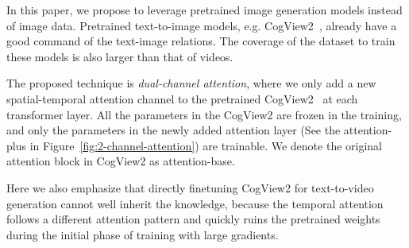 In this paper, we propose to leverage pretrained image generation models instead of image data. Pretrained text-to-image models, e.g. CogView2~\cite{ding2022cogview2}, already have a good command of the text-image relations. The coverage of the dataset to train these models is also larger than that of videos.  

The proposed technique is \emph{dual-channel attention}, where we only add a new spatial-temporal attention channel to the pretrained CogView2~\cite{ding2022cogview2} at each transformer layer. All the parameters in the CogView2 are frozen in the training, and only the parameters in the newly added attention layer (See the attention-plus in Figure~\ref{fig:2-channel-attention}) are trainable. We denote the original attention block in CogView2 as attention-base. 

Here we also emphasize that directly finetuning CogView2 for text-to-video generation cannot well inherit the knowledge, because the temporal attention follows a different attention pattern and quickly ruins the pretrained weights during the initial phase of training with large gradients.

